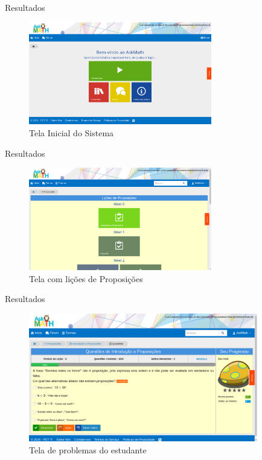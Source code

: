 \documentclass[aspectratio=169]{beamer}
\begin{document}
\begin{frame}{Resultados}
	\begin{figure}[H]
	\centering
	\caption{Tela Inicial do Sistema}
	\includegraphics[width=8cm]{figuras/askmath/1.png}
	\end{figure}
\end{frame}

\begin{frame}{Resultados}
	\begin{figure}[H]
	\centering
	\caption{Tela com lições de Proposições}
	\includegraphics[width=8cm]{figuras/askmath/2.png}
	\end{figure}
\end{frame}

\begin{frame}{Resultados}
	\begin{figure}[H]
	\centering
	\caption{Tela de problemas do estudante}
	\includegraphics[width=10cm]{figuras/askmath/4.png}
	\end{figure}
\end{frame}
\end{document}
